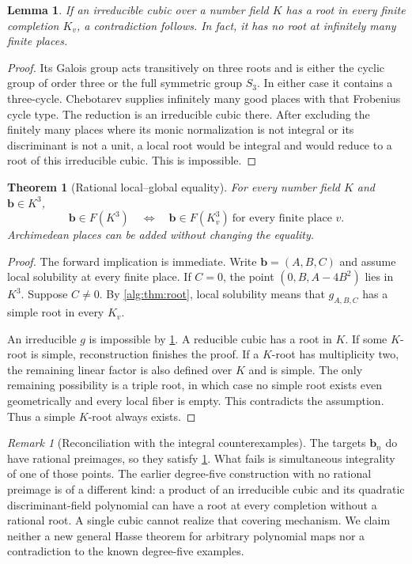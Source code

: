 \documentclass[11pt]{article}
\numberwithin{equation}{section}
\newtheorem{theorem}{Theorem}[section]
\theoremstyle{plain}
\theoremstyle{plain}
\newtheorem{lemma}[lemma]{Lemma}
\theoremstyle{plain}
\theoremstyle{definition}
\theoremstyle{definition}
\theoremstyle{definition}
\theoremstyle{remark}
\newtheorem{remark}[remark]{Remark}
\newcommand{\target}{\boldsymbol b}
\begin{document}
\begin{lemma}\label{alg:lem:cubicHasse}
If an irreducible cubic over a number field $K$ has a root in every finite
completion $K_v$, a contradiction follows. In fact, it has no root at
infinitely many finite places.
\end{lemma}
\begin{proof}
Its Galois group acts transitively on three roots and is either the cyclic
group of order three or the full symmetric group $S_3$. In either case
it contains a three-cycle. Chebotarev supplies infinitely many good
places with that Frobenius cycle type. The reduction is an irreducible
cubic there. After excluding the finitely many places where its monic
normalization is not integral or its discriminant is not a unit, a local
root would be integral and would reduce to a root of this irreducible
cubic. This is impossible.
\end{proof}

\begin{theorem}[Rational local--global equality]\label{alg:thm:rationalHasse}
For every number field $K$ and $\target\in K^3$,
\begin{equation}\label{alg:eq:rationalHasse}
 \target\in F(K^3)
 \quad\Longleftrightarrow\quad
 \target\in F(K_v^3)\ \text{for every finite place }v.
\end{equation}
Archimedean places can be added without changing the equality.
\end{theorem}
\begin{proof}
The forward implication is immediate. Write $\target=(A,B,C)$ and
assume local solubility at every finite place. If $C=0$, the point
$(0,B,A-4B^2)$ lies in $K^3$. Suppose $C\ne0$.
By \cref{alg:thm:root}, local solubility means that $g_{A,B,C}$ has a simple
root in every $K_v$.

An irreducible $g$ is impossible by \cref{alg:lem:cubicHasse}. A reducible
cubic has a root in $K$. If some $K$-root is simple, reconstruction
finishes the proof. If a $K$-root has multiplicity two, the remaining
linear factor is also defined over $K$ and is simple. The only remaining
possibility is a triple root, in which case no simple root exists even
geometrically and every local fiber is empty. This contradicts the
assumption. Thus a simple $K$-root always exists.
\end{proof}

\begin{remark}[Reconciliation with the integral counterexamples]
The targets $\target_n$ do have rational preimages, so they satisfy
\cref{alg:thm:rationalHasse}. What fails is simultaneous integrality of one
of those points. The earlier degree-five construction with no rational
preimage \cite{degreefive} is of a different kind: a product of an
irreducible cubic and its quadratic discriminant-field polynomial can
have a root at every completion without a rational root. A single cubic
cannot realize that covering mechanism. We claim neither a new general
Hasse theorem for arbitrary polynomial maps nor a contradiction to the
known degree-five examples.
\end{remark}
\end{document}
